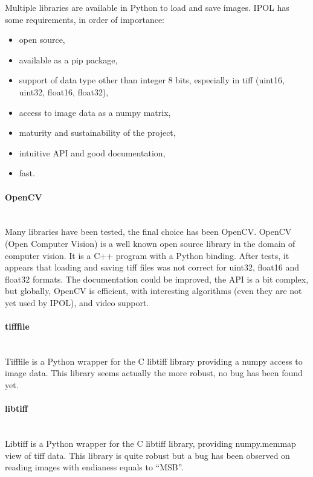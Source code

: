Multiple libraries are available in Python to load and save images. IPOL has some requirements, in order of importance:

\begin{itemize}
\item open source,
\item available as a pip package,
\item support of data type other than integer 8 bits, especially in tiff (uint16, uint32, float16, float32),
\item access to image data as a numpy matrix,
\item maturity and sustainability of the project,
\item intuitive API and good documentation,
\item fast.
\end{itemize}

\paragraph{OpenCV} \hspace{0pt} \\
Many libraries have been tested, the final choice has been OpenCV. OpenCV (Open Computer Vision) is a well known open source library in the domain of computer vision. It is a C++ program with a Python binding. After tests, it appears that loading and saving tiff files was not correct for uint32, float16 and float32 formats. The documentation could be improved, the API is a bit complex, but globally, OpenCV is efficient, with interesting algorithms (even they are not yet used by IPOL), and video support.

\paragraph{tifffile} \hspace{0pt} \\
Tifffile is a Python wrapper for the C libtiff library providing a numpy access to image data. This library seems actually the more robust, no bug has been found yet.

\paragraph{libtiff} \hspace{0pt} \\
Libtiff is a Python wrapper for the C libtiff library, providing numpy.memmap view of tiff data. This library is quite robust but a bug has been observed on reading images with endianess equals to ``MSB''.

